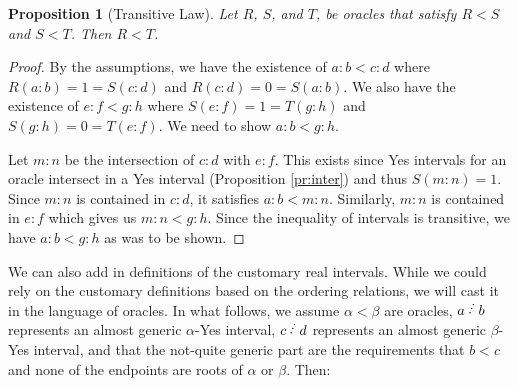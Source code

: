 \documentclass[12pt]{article}
\newtheorem{proposition}{Proposition}[subsection]
\begin{document}
\begin{proposition}[Transitive Law]\label{pr:transitive}
Let $R$, $S$, and $T$, be oracles that satisfy $R<S$ and $S < T$. Then $R < T$.
\end{proposition}

\begin{proof}
By the assumptions, we have the existence of $a:b < c:d$ where $R(a:b) = 1 = S(c:d)$ and $R(c:d) = 0 = S(a:b)$. We also have the existence of $e:f < g:h$ where $S(e:f) = 1 = T(g:h)$ and $S(g:h) = 0 = T(e:f)$. We need to show $a:b < g:h$.

Let $m:n$ be the intersection of $c:d$ with $e:f$. This exists since Yes intervals for an oracle intersect in a Yes interval (Proposition \ref{pr:inter}) and thus $S(m:n) = 1$. Since $m:n$ is contained in $c:d$, it satisfies $a:b < m:n$. Similarly, $m:n$ is contained in $e:f$ which gives us $m:n < g:h$. Since the inequality of intervals is transitive, we have $a:b < g:h$ as was to be shown. 
\end{proof}

We can also add in definitions of the customary real intervals. While we could rely on the customary definitions based on the ordering relations, we will cast it in the language of oracles. In what follows, we assume $\alpha < \beta$ are oracles,  $a\lte b$ represents an almost generic $\alpha$-Yes interval, $c\lte d$ represents an almost generic $\beta$-Yes interval, and that the not-quite generic part are the requirements that $b < c$ and none of the endpoints are roots of $\alpha$ or $\beta$. Then: 
\end{document}
